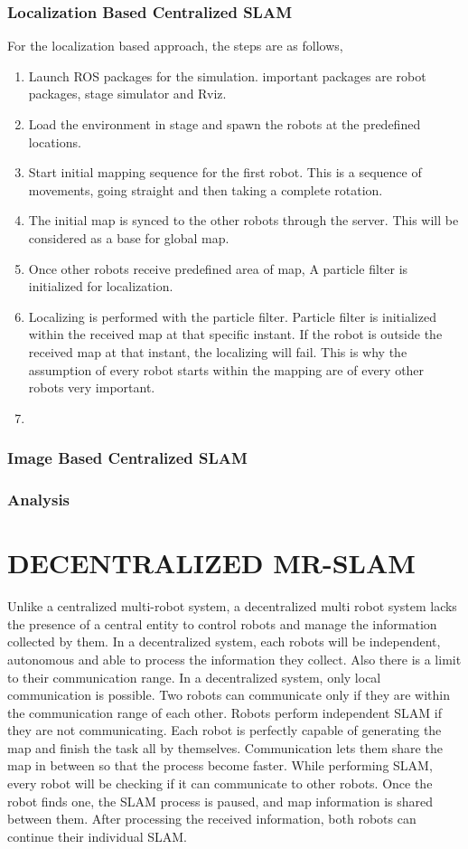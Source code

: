 \documentclass[MTech]{iitmdiss}
\begin{document}
\subsection{Localization Based Centralized SLAM}
For the localization based approach, the steps are as follows,
\begin{enumerate}
    \item Launch ROS packages for the simulation. important packages are robot packages, stage simulator and Rviz. 
    \item Load the environment in stage and spawn the robots at the predefined locations.
    \item Start initial mapping sequence for the first robot. This is a sequence of movements, going straight and then taking a complete rotation.
    \item The initial map is synced to the other robots through the server. This will be considered as a base for global map.
    \item Once other robots receive predefined area of map, A particle filter is initialized for localization.
    \item Localizing is performed with the particle filter. Particle filter is initialized within the received map at that specific instant. If the robot is outside the received map at that instant, the localizing will fail. This is why the assumption of every robot starts within the mapping are of every other robots very important.
    \item 
\end{enumerate}

\subsection{Image Based Centralized SLAM}

\subsection{Analysis}
 
\chapter{DECENTRALIZED MR-SLAM}
\label{chap:intro}
Unlike a centralized multi-robot system, a decentralized multi robot system lacks the presence of a central entity to control robots and manage the information collected by them. In a decentralized system, each robots will be independent, autonomous and able to process the information they collect. Also there is a limit to their communication range.
In a decentralized system, only local communication is possible. Two robots can communicate only if they are within the communication range of each other. Robots perform independent SLAM if they are not communicating. Each robot is perfectly capable of generating the map and finish the task all by themselves. Communication lets them share the map in between so that the process become faster. While performing SLAM, every robot will be checking if it can communicate to other robots. Once the robot finds one, the SLAM process is paused, and map information is shared between them. After processing the received information, both robots can continue their individual SLAM.
\end{document}
